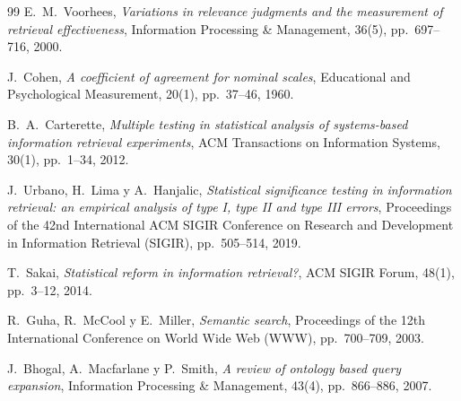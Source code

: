 \documentclass[11pt,letterpaper]{article}
\numberwithin{equation}{section}
\begin{document}
\begin{thebibliography}{99}
E.~M.~Voorhees,
\textit{Variations in relevance judgments and the measurement of retrieval effectiveness},
Information Processing \& Management, 36(5), pp.~697--716, 2000.

J.~Cohen,
\textit{A coefficient of agreement for nominal scales},
Educational and Psychological Measurement, 20(1), pp.~37--46, 1960.

B.~A.~Carterette,
\textit{Multiple testing in statistical analysis of systems-based information retrieval experiments},
ACM Transactions on Information Systems, 30(1), pp.~1--34, 2012.

J.~Urbano, H.~Lima y A.~Hanjalic,
\textit{Statistical significance testing in information retrieval: an empirical analysis of type {I}, type {II} and type {III} errors},
Proceedings of the 42nd International ACM SIGIR Conference on Research and Development in Information Retrieval (SIGIR), pp.~505--514, 2019.

T.~Sakai,
\textit{Statistical reform in information retrieval?},
ACM SIGIR Forum, 48(1), pp.~3--12, 2014.

R.~Guha, R.~McCool y E.~Miller,
\textit{Semantic search},
Proceedings of the 12th International Conference on World Wide Web (WWW), pp.~700--709, 2003.

J.~Bhogal, A.~Macfarlane y P.~Smith,
\textit{A review of ontology based query expansion},
Information Processing \& Management, 43(4), pp.~866--886, 2007.


\end{thebibliography}
\end{document}
